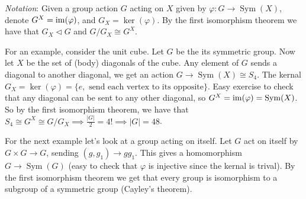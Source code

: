 \documentclass{article}
\newcommand{\nrm}{\triangleleft}
\DeclareMathOperator{\sym}{Sym}
\begin{document}
\par
\par \textit{Notation}: Given a group action $ G $ acting on $ X $ given by $ \varphi:G\to\sym(X) $, denote $ G^X=\operatorname{im}(\varphi) $, and $ G_X=\ker(\varphi) $. By the first isomorphism theorem we have that $ G_X\nrm G $ and $ G/G_X\cong G^X $.

\par
For an example, consider the unit cube. Let $ G $ be the its symmetric group. Now let $ X $ be the set of (body) diagonals of the cube. Any element of $ G $ sends a diagonal to another diagonal, we get an action $ G\to\sym(X)\cong S_4 $. The kernal $ G_X=\ker(\varphi)=\{e, \text{ send each vertex to its opposite} \} $. Easy exercise to check that any diagonal can be sent to any other diagonal, so $ G^X=\ima (\varphi)=\sym(X) $. So by the first isomorphism theorem, we have that $ S_4\cong G^X\cong G/G_X\implies \frac{|G|}2 = 4!\implies |G|=48 $.

\par
For the next example let's look at a group acting on itself. Let $ G $ act on itself by $ G\times G\to G $, sending $ (g,g_1)\to gg_1 $. This gives a homomorphism $ G\to \sym(G) $ (easy to check that $ \varphi $ is injective since the kernal is trival). By the first isomorphism theorem we get that every group is isomorphism to a subgroup of a symmetric group (Cayley's theorem).
\end{document}
